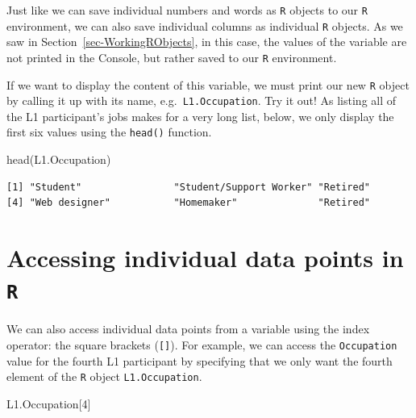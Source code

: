 \documentclass[
  letterpaper,
  DIV=11,
  numbers=noendperiod]{scrreprt}
\newenvironment{Shaded}{\begin{snugshade}}{\end{snugshade}}
\newcommand{\DecValTok}[1]{\textcolor[rgb]{0.68,0.00,0.00}{#1}}
\newcommand{\FunctionTok}[1]{\textcolor[rgb]{0.28,0.35,0.67}{#1}}
\newcommand{\NormalTok}[1]{\textcolor[rgb]{0.00,0.23,0.31}{#1}}
\newcommand{\OtherTok}[1]{\textcolor[rgb]{0.00,0.23,0.31}{#1}}
\newcommand{\SpecialCharTok}[1]{\textcolor[rgb]{0.37,0.37,0.37}{#1}}
\begin{document}
Just like we can save individual numbers and words as \texttt{R} objects
to our \texttt{R} environment, we can also save individual columns as
individual \texttt{R} objects. As we saw in
Section~\ref{sec-WorkingRObjects}, in this case, the values of the
variable are not printed in the Console, but rather saved to our
\texttt{R} environment.

\begin{Shaded}
\end{Shaded}

If we want to display the content of this variable, we must print our
new \texttt{R} object by calling it up with its name,
e.g.~\texttt{L1.Occupation}. Try it out! As listing all of the L1
participant's jobs makes for a very long list, below, we only display
the first six values using the \texttt{head()} function.

\begin{Shaded}
\begin{Highlighting}[]
\FunctionTok{head}\NormalTok{(L1.Occupation)}
\end{Highlighting}
\end{Shaded}

\begin{verbatim}
[1] "Student"                "Student/Support Worker" "Retired"               
[4] "Web designer"           "Homemaker"              "Retired"               
\end{verbatim}

\section{\texorpdfstring{Accessing individual data points in
\texttt{R}}{Accessing individual data points in R}}\label{sec-SquareBrackets}

We can also access individual data points from a variable using the
index operator: the square brackets (\texttt{{[}{]}}). For example, we
can access the \texttt{Occupation} value for the fourth L1 participant
by specifying that we only want the fourth element of the \texttt{R}
object \texttt{L1.Occupation}.

\begin{Shaded}
\begin{Highlighting}[]
\NormalTok{L1.Occupation[}\DecValTok{4}\NormalTok{]}
\end{Highlighting}
\end{Shaded}
\end{document}
